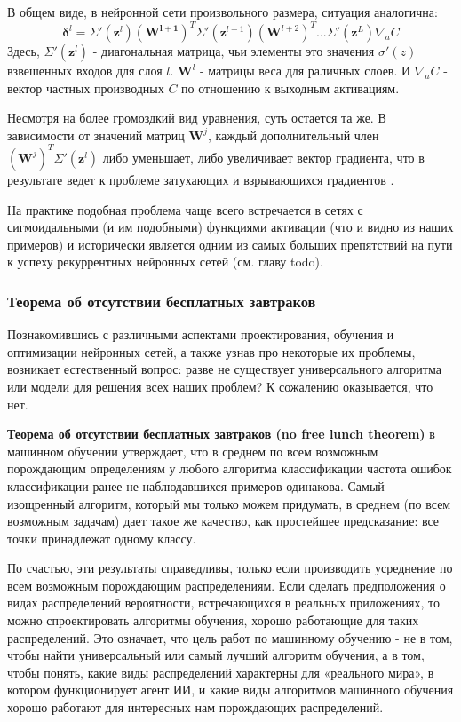 В общем виде, в нейронной сети произвольного размера, ситуация аналогична:
\begin{equation*}
    \bm{\delta}^l = \Sigma'(\bm{z}^l) (\bm{W^{l+1}})^T \Sigma' (\bm{z}^{l+1}) (\bm{W}^{l+2})^T ... \Sigma' (\bm{z}^L) \nabla_a C
\end{equation*}
Здесь, $\Sigma' (\bm{z}^l)$ - диагональная матрица, чьи элементы это значения 
$\sigma'(z)$ взвешенных входов для слоя $l$. $\bm{W}^l$ - матрицы веса для 
раличных слоев. И $\nabla_a C$ - вектор частных производных $C$ по отношению к 
выходным активациям.

Несмотря на более громоздкий вид уравнения, суть остается та же. В зависимости от 
значений матриц $\bm{W}^j$, каждый дополнительный член $(\bm{W}^j)^T \Sigma' (\bm{z}^l)$ 
либо уменьшает, либо увеличивает вектор градиента, что в результате ведет к 
проблеме затухающих и взрывающихся градиентов \cite{NN_Nielsen}.

На практике подобная проблема чаще всего встречается в 
сетях с сигмоидальными (и им подобными)
функциями активации (что и видно из наших примеров) и исторически 
является одним из самых больших препятствий на пути к успеху рекуррентных 
нейронных сетей (см. главу {\color{red}todo}).

\subsubsection{Теорема об отсутствии бесплатных завтраков}

Познакомившись с различными аспектами проектирования, 
обучения и оптимизации нейронных сетей, а также узнав про некоторые их проблемы, 
возникает естественный вопрос: разве не существует универсального алгоритма или 
модели для решения всех наших проблем? К сожалению оказывается, что нет.

\textbf{Теорема об отсутствии бесплатных завтраков (no free lunch theorem)} 
в машинном обучении \cite{NFL} утверждает, что в среднем по 
всем возможным порождающим определениям у любого алгоритма классификации 
частота ошибок классификации ранее не наблюдавшихся примеров одинакова.
Самый изощренный алгоритм, который мы только можем придумать, в среднем (по
всем возможным задачам) дает такое же качество, как простейшее предсказание: все
точки принадлежат одному классу.

По счастью, эти результаты справедливы, только если производить усреднение по
всем возможным порождающим распределениям. Если сделать предположения о видах 
распределений вероятности, встречающихся в реальных приложениях, то можно
спроектировать алгоритмы обучения, хорошо работающие для таких распределений.
Это означает, что цель работ по машинному обучению - не в том, чтобы найти
универсальный или самый лучший алгоритм обучения, а в том, чтобы понять, какие
виды распределений характерны для «реального мира», в котором функционирует
агент ИИ, и какие виды алгоритмов машинного обучения хорошо работают для интересных 
нам порождающих распределений.

